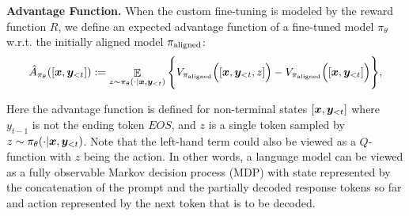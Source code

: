  

\textbf{Advantage Function.} 
When the custom fine-tuning is modeled by the reward function $R$, we define an expected advantage function of a fine-tuned model $\pi_\theta$ w.r.t. the initially aligned model $\pi_{\mathrm{aligned}}$:
\begin{equation}
   \hat{A}_{\pi_{\theta}}([\bm{x}, \bm{y}_{< t}]) := \mathop{\mathbb{E}}_{z \sim \pi_{\theta}(\cdot | \bm{x}, \bm{y}_{< t})} \Bigg\{V_{\pi_{\mathrm{aligned}}}\Big([\bm{x}, \bm{y}_{< t}, z]\Big) - V_{\pi_{\mathrm{aligned}}}\Big([\bm{x}, \bm{y}_{< t}]\Big)\Bigg\},
\end{equation}

Here the advantage function is defined for non-terminal states $[\bm{x}, \bm{y}_{< t}]$ where $y_{t-1}$ is not the ending token $EOS$, and $z$ is a single token sampled by $z \sim \pi_\theta(\cdot | \bm{x}, \bm{y}_{< t})$. Note that the left-hand term could also be viewed as a $Q$-function with $z$ being the action. In other words, a language model can be viewed as a fully observable Markov decision process (MDP) with state represented by the concatenation of the prompt and the partially decoded response tokens so far and action represented by the next token that is to be decoded. 




